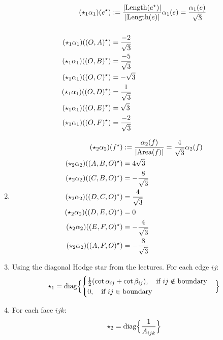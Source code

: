 \documentclass{article}
\def\nt{\notag}
\def\hal{\frac{1}{2}}
\begin{document}
\begin{enumerate}[label=(\alph*)]
    \begin{align}
        (\star_1\alpha_1)(e^\star) &:= \frac{|\text{Length}(e^\star)|}{|\text{Length}(e)|}\alpha_1(e) = \frac{\alpha_1(e)}{\sqrt3}\nt\\\nt\\
        (\star_1\alpha_1)((O,A)^\star) &= \frac{-2}{\sqrt3} \nt\\
        (\star_1\alpha_1)((O,B)^\star) &= \frac{-5}{\sqrt3} \nt\\
        (\star_1\alpha_1)((O,C)^\star) &= -\sqrt3 \nt\\
        (\star_1\alpha_1)((O,D)^\star) &= \frac{1}{\sqrt3} \nt\\
        (\star_1\alpha_1)((O,E)^\star) &= \sqrt3 \nt\\
        (\star_1\alpha_1)((O,F)^\star) &= \frac{-2}{\sqrt3} \nt
    \end{align}

    \item
    \begin{align}
        (\star_2\alpha_2)(f^\star) &:= \frac{\alpha_2(f)}{|\text{Area}( f )|} = \frac{4}{\sqrt3}\alpha_2(f)\nt\\
        (\star_2\alpha_2)((A,B,O)^\star) &= 4 \sqrt{3} \nt\\
        (\star_2\alpha_2)((C,B,O)^\star) &= -\frac{8}{\sqrt{3}} \nt\\
        (\star_2\alpha_2)((D,C,O)^\star) &= \frac{4}{\sqrt{3}} \nt\\
        (\star_2\alpha_2)((D,E,O)^\star) &= 0 \nt\\
        (\star_2\alpha_2)((E,F,O)^\star) &= -\frac{4}{\sqrt{3}} \nt\\
        (\star_2\alpha_2)((A,F,O)^\star) &= -\frac{8}{\sqrt{3}} \nt
    \end{align}

    \item
    Using the diagonal Hodge star from the lectures.
    For each edge $ij$:
    $$
        \star_1 = \text{diag}\Bigl\{
            \begin{cases}
                \hal (\cot\alpha_{ij} + \cot\beta_{ij}), \quad \text{if $ij \notin$ boundary} \\
                0, \quad \text{if $ij \in$ boundary}
            \end{cases}
        \Bigr\}
    $$

    \item
    For each face $ijk$:
    $$
        \star_2 = \text{diag}\Bigl\{\frac{1}{A_{ijk}}\Bigr\}
    $$
\end{enumerate}
\end{document}
